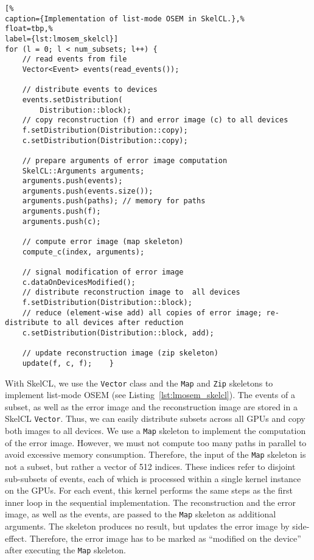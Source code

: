 \begin{lstlisting}[%
caption={Implementation of list-mode OSEM in SkelCL.},%
float=tbp,%
label={lst:lmosem_skelcl}]
for (l = 0; l < num_subsets; l++) {
	// read events from file
	Vector<Event> events(read_events());
	
	// distribute events to devices
	events.setDistribution(
		Distribution::block);
	// copy reconstruction (f) and error image (c) to all devices
	f.setDistribution(Distribution::copy);
	c.setDistribution(Distribution::copy);
	
	// prepare arguments of error image computation
	SkelCL::Arguments arguments;
	arguments.push(events);
	arguments.push(events.size());
	arguments.push(paths); // memory for paths
	arguments.push(f);
	arguments.push(c);
	
	// compute error image (map skeleton)
	compute_c(index, arguments);
	
	// signal modification of error image
	c.dataOnDevicesModified();
	// distribute reconstruction image to  all devices
	f.setDistribution(Distribution::block);
	// reduce (element-wise add) all copies of error image; re-distribute to all devices after reduction
	c.setDistribution(Distribution::block, add);
	
	// update reconstruction image (zip skeleton)
	update(f, c, f);	}
\end{lstlisting}

With SkelCL, we use the \texttt{Vector} class and the \texttt{Map} and \texttt{Zip} skeletons to implement list-mode OSEM (see Listing~\ref{lst:lmosem_skelcl}).
The events of a subset, as well as the error image and the reconstruction image are stored in a SkelCL \texttt{Vector}.
Thus, we can easily distribute subsets across all GPUs and copy both images to all devices.
We use a \texttt{Map} skeleton to implement the computation of the error image.
However, we must not compute too many paths in parallel to avoid excessive memory consumption.
Therefore, the input of the \texttt{Map} skeleton is not a subset, but rather a vector of 512 indices.
These indices refer to disjoint sub-subsets of events, each of which is processed within a single kernel instance on the GPUs.
For each event, this kernel performs the same steps as the first inner loop in the sequential implementation.
The reconstruction and the error image, as well as the events, are passed to the \texttt{Map} skeleton as additional arguments.
The skeleton produces no result, but updates the error image by side-effect.
Therefore, the error image has to be marked as ``modified on the device'' after executing the \texttt{Map} skeleton.

